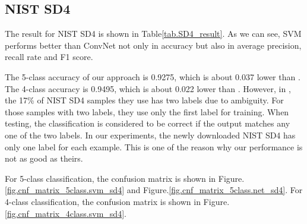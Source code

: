 \subsection{NIST SD4}

The result for NIST SD4 is shown in Table\ref{tab.SD4_result}. 
%
As we can see, SVM performs better than ConvNet not only in accuracy but also in average precision, recall rate and F1 score. 

The 5-class accuracy of our approach is 0.9275, which is about 0.037 lower than \cite{cao2013fingerprint}. The 4-class accuracy is 0.9495, which is about 0.022 lower than \cite{cao2013fingerprint}.
%
However, in \cite{cao2013fingerprint}, the 17\% of NIST SD4 samples they use has two labels due to ambiguity. For those samples with two labels, they use only the first label for training. When testing, the classification is considered to be correct if the output matches any one of the two labels. In our experiments, the newly downloaded NIST SD4 has only one label for each example. This is one of the reason why our performance is not as good as theirs.


For 5-class classification, the confusion matrix is shown in Figure.\ref{fig.cnf_matrix_5class.svm_sd4} and Figure.\ref{fig.cnf_matrix_5class.net_sd4}.
For 4-class classification, the confusion matrix is shown in Figure.\ref{fig.cnf_matrix_4class.svm_sd4}.


